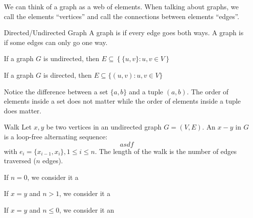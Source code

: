 \documentclass[12pt]{report}
\begin{document}
We can think of a graph as a web of elements. When talking about graphs, we call the elements ``vertices'' and call the connections between elements ``edges''.

\begin{dfnbox}{Directed/Undirected Graph}
	A graph is  if every edge goes both ways. A graph is  if some edges can only go one way.
	\begin{dfnitems}
		\item If a graph $G$ is undirected, then $E \subseteq \left\{\{u,v\} : u,v \in V \right\}$
		\item If a graph $G$ is directed, then $E \subseteq \{(u,v) : u,v \in V\}$
	\end{dfnitems}
\end{dfnbox}

Notice the difference between a set $\{a,b\}$ and a tuple $(a,b)$. The order of elements inside a set does not matter while the order of elements inside a tuple does matter.

\begin{dfnbox}{Walk}
	Let $x,y$ be two vertices in an undirected graph $G = (V,E)$. An $x-y$  in $G$ is a loop-free alternating sequence:
	$$ asdf $$
	with $e_i = \{x_{i-1}, x_i\}, 1 \leq i \leq n$. The length of the walk is the number of edges traversed ($n$ edges).

	\begin{dfnitems}
		\item If $n=0$, we consider it a 
		\item If $x=y$ and $n>1$, we consider it a 
		\item If $x=y$ and $n \leq 0$, we consider it an 
	\end{dfnitems}
\end{dfnbox}
\end{document}
